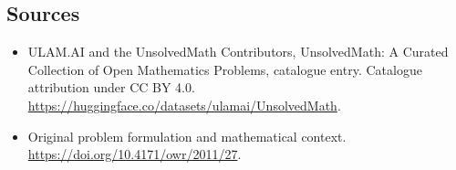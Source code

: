 \documentclass[11pt]{article}
\begin{document}
\subsection{Sources}
\begin{itemize}
\item[\hypertarget{source:statement:1}{S1}] ULAM.AI and the UnsolvedMath Contributors, UnsolvedMath: A Curated Collection of Open Mathematics Problems, catalogue entry. Catalogue attribution under CC BY 4.0.
\url{https://huggingface.co/datasets/ulamai/UnsolvedMath}.
\item[\hypertarget{source:statement:2}{S2}] Original problem formulation and mathematical context.
\url{https://doi.org/10.4171/owr/2011/27}.
\end{itemize}
\label{end:statement}
\end{document}
